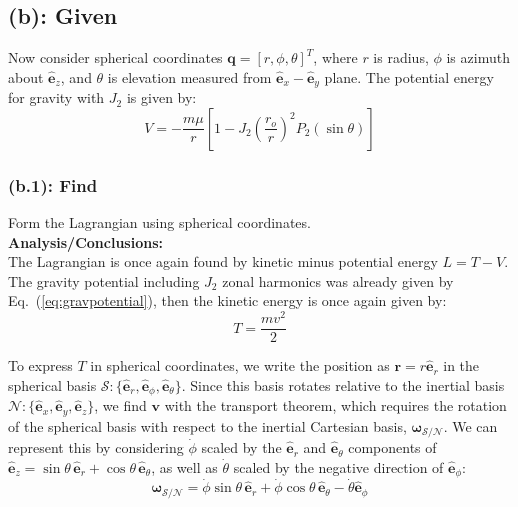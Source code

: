 \documentclass[titlepage]{article}
\begin{document}
\newpage

\subsection*{(b): Given}

Now consider spherical coordinates $\boldsymbol{q}=[r,\phi,\theta]^T$, where $r$ is radius, $\phi$ is azimuth about $\hat{\boldsymbol{e}}_z$, and $\theta$ is elevation measured from $\hat{\boldsymbol{e}}_x-\hat{\boldsymbol{e}}_y$ plane. The potential energy for gravity with $J_2$ is given by:
\begin{equation}
	V=-\frac{m\mu}{r}\left[1-J_2\left(\frac{r_o}{r}\right)^2P_2(\sin\theta)\right]
	\label{eq:gravpotential}
\end{equation}

\subsubsection*{(b.1): Find}

Form the Lagrangian using spherical coordinates.\\

\textbf{Analysis/Conclusions:}\\

The Lagrangian is once again found by kinetic minus potential energy $L=T-V$. The gravity potential including $J_2$ zonal harmonics was already given by Eq.~(\ref{eq:gravpotential}), then the kinetic energy is once again given by:
\begin{equation}
	T=\frac{mv^2}{2}
	\label{eq:kinetic}
\end{equation}

To express $T$ in spherical coordinates, we write the position as $\boldsymbol{r}=r\hat{\boldsymbol{e}}_r$ in the spherical basis $\mathcal{S}:\{\hat{\boldsymbol{e}}_r,\hat{\boldsymbol{e}}_\phi,\hat{\boldsymbol{e}}_\theta\}$. Since this basis rotates relative to the inertial basis $\mathcal{N}:\{\hat{\boldsymbol{e}}_x,\hat{\boldsymbol{e}}_y,\hat{\boldsymbol{e}}_z\}$, we find $\boldsymbol{v}$ with the transport theorem, which requires the rotation of the spherical basis with respect to the inertial Cartesian basis, $\boldsymbol{\omega}_{\mathcal{S}/\mathcal{N}}$. We can represent this by considering $\dot{\phi}$ scaled by the $\hat{\boldsymbol{e}}_r$ and $\hat{\boldsymbol{e}}_\theta$ components of $\hat{\boldsymbol{e}}_z=\sin\theta\,\hat{\boldsymbol{e}}_r+\cos\theta\,\hat{\boldsymbol{e}}_\theta$, as well as $\dot{\theta}$ scaled by the negative direction of $\hat{\boldsymbol{e}}_\phi$:
\begin{equation}
	\boldsymbol{\omega}_{\mathcal{S}/\mathcal{N}}=\dot{\phi}\sin\theta\,\hat{\boldsymbol{e}}_r+\dot{\phi}\cos\theta\,\hat{\boldsymbol{e}}_\theta-\dot{\theta}\hat{\boldsymbol{e}}_\phi
\end{equation}
\end{document}
